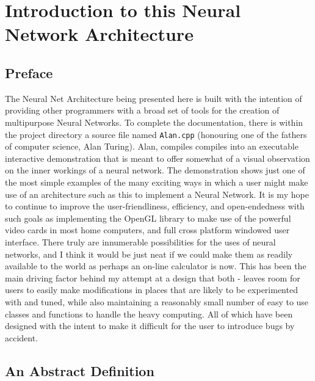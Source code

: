 \documentclass[a4paper,10pt]{article}
\begin{document}
\large\tableofcontents
\newpage\normalsize

 
\section{Introduction to this Neural Network Architecture}

\subsection{Preface}

The Neural Net Architecture being presented here is built with the intention of providing other programmers with a
broad set of tools for the creation of multipurpose Neural Networks. To complete the documentation, there is
within the project directory a source file named \texttt{Alan.cpp} (honouring one of the fathers of computer science,
Alan Turing). Alan, compiles compiles into an executable interactive demonstration that is meant to offer somewhat of a
visual observation on the inner workings of a neural network.  The demonstration shows just one of the most simple
examples of the many exciting ways in which a user might make use of an architecture such as this to implement a Neural
Network. It is my hope to continue to improve the user-friendliness, efficiency, and open-endedness with such goals as
implementing the OpenGL library to make use of the powerful video cards in most home computers, and full cross platform
windowed user interface. There truly are innumerable possibilities for the uses of neural networks, and I think it
would be just neat if we could make them as readily available to the world as perhaps an on-line calculator is now.
This has been the main driving factor behind my attempt at a design that both - leaves room for users to easily make
modifications in places that are likely to be experimented with and tuned, while also maintaining a reasonably small
number of easy to use classes and functions to handle the heavy computing.  All of which have been designed with the
intent to make it difficult for the user to introduce bugs by accident.

\subsection{An Abstract Definition}
\end{document}
